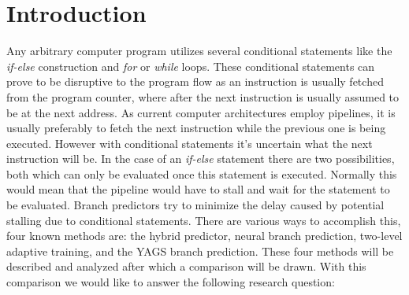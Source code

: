 \section{Introduction}

Any arbitrary computer program utilizes several conditional statements like the \textit{if-else} construction and \textit{for} or \textit{while} loops. These conditional statements can prove to be disruptive to the program flow as an instruction is usually fetched from the program counter, where after the next instruction is usually assumed to be at the next address. As current computer architectures employ pipelines, it is usually preferably to fetch the next instruction while the previous one is being executed. However with conditional statements it's uncertain what the next instruction will be. In the case of an \textit{if-else} statement there are two possibilities, both which can only be evaluated once this statement is executed. Normally this would mean that the pipeline would have to stall and wait for the statement to be evaluated. Branch predictors try to minimize the delay caused by potential stalling due to conditional statements. There are various ways to accomplish this, four known methods are: the hybrid predictor, neural branch prediction, two-level adaptive training, and the YAGS branch prediction. These four methods will be described and analyzed after which a comparison will be drawn. With this comparison we would like to answer the following research question:\\\\ \\\\
